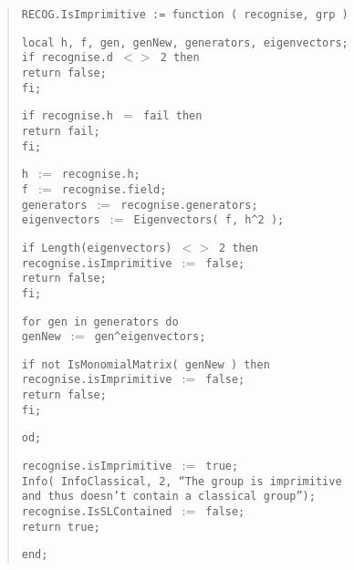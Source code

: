\documentclass[a4paper,11pt]{article}
\theoremstyle{bla}
\begin{document}
\begin{quote}
\hspace*{-0.3cm} \texttt{RECOG.IsImprimitive := function ( recognise, grp )}

  \texttt{local h, f, gen, genNew, generators, eigenvectors;}\\

  \texttt{if recognise.d $<>$ 2 then}\\
     \hspace*{0.3cm} \texttt{return false;}\\
  \texttt{fi;}

  \texttt{if recognise.h $=$ fail then}\\
    \hspace*{0.3cm} \texttt{return fail;}\\
  \texttt{fi;}

  \texttt{h $:=$ recognise.h;}\\
  \texttt{f $:=$ recognise.field;}\\
  \texttt{generators $:=$ recognise.generators;}\\
  \texttt{eigenvectors $:=$ Eigenvectors( f, h\^{}2 );}

  \texttt{if Length(eigenvectors) $<>$ 2 then}\\
    \hspace*{0.3cm} \texttt{recognise.isImprimitive $:=$ false;}\\
    \hspace*{0.3cm} \texttt{return false;}\\
  \texttt{fi;}

  \texttt{for gen in generators do}\\
    \hspace*{0.3cm} \texttt{genNew $:=$ gen\^{}eigenvectors;}

    \hspace*{0.3cm} \texttt{if not IsMonomialMatrix( genNew ) then}\\
      \hspace*{0.6cm} \texttt{recognise.isImprimitive $:=$ false;}\\
      \hspace*{0.6cm} \texttt{return false;}\\
    \hspace*{0.3cm} \texttt{fi;}

  \texttt{od;}

  \texttt{recognise.isImprimitive $:=$ true;}\\
  \texttt{Info( InfoClassical, 2, ``The group is imprimitive}\\
  \texttt{and thus doesn't contain a classical group'');}\\
  \texttt{recognise.IsSLContained $:=$ false;}\\
  \texttt{return true;}

\hspace*{-0.3cm} \texttt{end;}
\end{quote}
\end{document}
